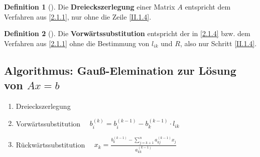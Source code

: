 \documentclass[ngerman,fontsize=11pt, paper=a4, parskip=half, titlepage=true, toc=bib]{scrbook}
\theoremstyle{definition}
\newtheorem{Def}{Definition}[section]		%
\theoremstyle{plain}
\newcommand{\subsectione}[1]{\addtocounter{Def}{1}\subsection{#1}}
\newenvironment{Defe}[1][]{ %
  \begin{Def}[#1]
  }
  {
  \end{Def}
  \addtocounter{subsection}{1}
}
\begin{document}
\begin{Defe}
  \label{2.1.5}
  Die \textbf{Dreieckszerlegung} einer Matrix $A$
  entspricht dem Verfahren aus \ref{2.1.1}, nur ohne die Zeile \eqref{II.1.4}.
\end{Defe}



\begin{Defe}
  Die \textbf{Vorwärtssubstitution} entspricht der in \ref{2.1.4}
  bzw. dem Verfahren aus \ref{2.1.1} 
  ohne die Bestimmung von $l_{ik}$ und $R$, also nur Schritt \eqref{II.1.4}.
\end{Defe}

\subsectione{Algorithmus: Gauß-Elemination zur Lösung von $Ax=b$}
\begin{framed}
  \begin{enumerate}[1]
  \item Dreieckszerlegung
  \item Vorwärtssubstitution        $\quad b_i^{(k)} = b_i^{(k-1)} -b_k^{(k-1)} \cdot   l_{ik} $
  \item Rückwärtssubstitution      $\quad x_k = \frac{b_k^{(k-1)}-\sum_{j=k+1}^{n}a_{kj}^{(k-1)}x_j}{a_{kk}^{(k-1)}}$
  \end{enumerate}
\end{framed}
\end{document}
